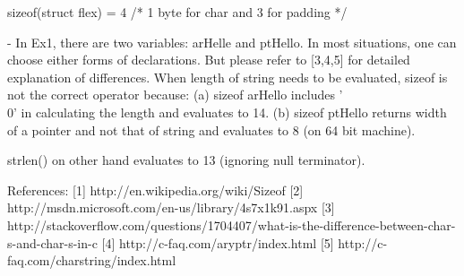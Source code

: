 \documentclass{article}
\begin{document}
        sizeof(struct flex) = 4 /* 1 byte for char and 3 for padding */


- In Ex1, there are two variables: arHelle and ptHello. In most
  situations, one can choose either forms of declarations. But please
  refer to [3,4,5] for detailed explanation of differences. When length of
  string needs to be evaluated, sizeof is not the correct operator
  because: 
  (a) sizeof arHello includes '\\0' in calculating the length and evaluates
  to 14. 
  (b) sizeof ptHello returns width of a pointer and not that of string and
  evaluates to 8 (on 64 bit machine). 

  strlen() on other hand evaluates to 13 (ignoring null terminator).  



References: 
[1] http://en.wikipedia.org/wiki/Sizeof
[2] http://msdn.microsoft.com/en-us/library/4s7x1k91.aspx
[3] http://stackoverflow.com/questions/1704407/what-is-the-difference-between-char-s-and-char-s-in-c
[4] http://c-faq.com/aryptr/index.html
[5] http://c-faq.com/charstring/index.html
\end{document}
